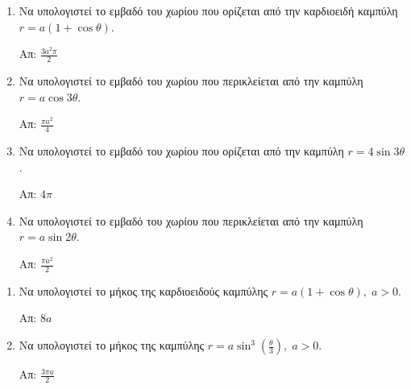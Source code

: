 


\everymath{\displaystyle}
\pagestyle{askhseis}


\begin{center}
  \minibox{\large\bfseries \textcolor{Col1}{Πολικές Καμπύλες}}
\end{center}

\vspace{\baselineskip}

\begin{center}
\end{center}

\vspace{\baselineskip}

\begin{enumerate}
	\item Να υπολογιστεί το εμβαδό του χωρίου που ορίζεται από την καρδιοειδή καμπύλη
        $ r = a(1  + \cos{\theta}) $.

		\hfill Απ: $ \frac{3a^{2}\pi}{2} $

	\item Να υπολογιστεί το εμβαδό του χωρίου που περικλείεται από την καμπύλη $
		r = a \cos{3\theta} $.

		\hfill Απ: $ \frac{\pi a^{2}}{4} $

	\item Να υπολογιστεί το εμβαδό του χωρίου που ορίζεται από την καμπύλη 
        $ r = 4 \sin{3\theta}  $. 

        \hfill Απ: $ 4 \pi $  

	\item Να υπολογιστεί το εμβαδό του χωρίου που περικλείεται από την καμπύλη $
		r = a \sin{2\theta} $.

		\hfill Απ: $ \frac{\pi a^{2}}{2} $

\end{enumerate}

\begin{center}
\end{center}

\vspace{\baselineskip}

\begin{enumerate}

    \item Να υπολογιστεί το μήκος της καρδιοειδούς καμπύλης $ r = a(1 + \cos{\theta}), 
        \; a>0 $.

		\hfill Απ: $ 8 a $

	\item Να υπολογιστεί το μήκος της καμπύλης 
        $ r = a\sin^{3}{\left(\frac{\theta}{3}\right)}, \; a>0 $.

        \hfill Απ: $ \frac{3 \pi a}{2} $ 
\end{enumerate}

